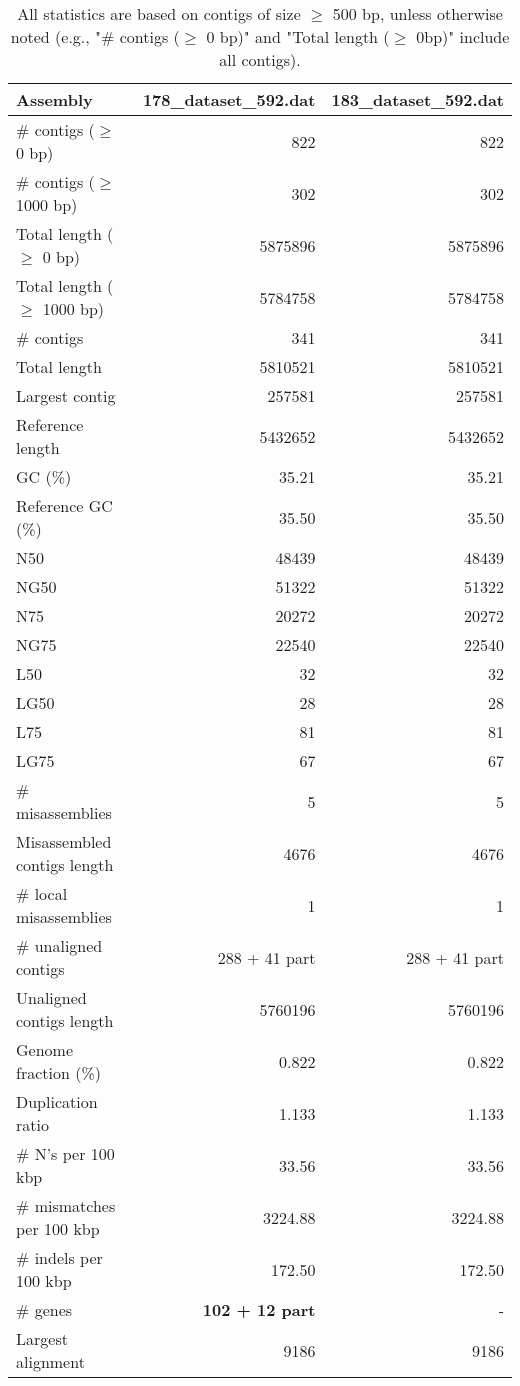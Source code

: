 \documentclass[12pt,a4paper]{article}
\begin{document}
\begin{table}[ht]
\begin{center}
\caption{All statistics are based on contigs of size $\geq$ 500 bp, unless otherwise noted (e.g., "\# contigs ($\geq$ 0 bp)" and "Total length ($\geq$ 0bp)" include all contigs).}
\begin{tabular}{|l*{2}{|r}|}
\hline
Assembly & 178\_dataset\_592.dat & 183\_dataset\_592.dat \\ \hline
\# contigs ($\geq$ 0 bp) & 822 & 822 \\ \hline
\# contigs ($\geq$ 1000 bp) & 302 & 302 \\ \hline
Total length ($\geq$ 0 bp) & 5875896 & 5875896 \\ \hline
Total length ($\geq$ 1000 bp) & 5784758 & 5784758 \\ \hline
\# contigs & 341 & 341 \\ \hline
Total length & 5810521 & 5810521 \\ \hline
Largest contig & 257581 & 257581 \\ \hline
Reference length & 5432652 & 5432652 \\ \hline
GC (\%) & 35.21 & 35.21 \\ \hline
Reference GC (\%) & 35.50 & 35.50 \\ \hline
N50 & 48439 & 48439 \\ \hline
NG50 & 51322 & 51322 \\ \hline
N75 & 20272 & 20272 \\ \hline
NG75 & 22540 & 22540 \\ \hline
L50 & 32 & 32 \\ \hline
LG50 & 28 & 28 \\ \hline
L75 & 81 & 81 \\ \hline
LG75 & 67 & 67 \\ \hline
\# misassemblies & 5 & 5 \\ \hline
Misassembled contigs length & 4676 & 4676 \\ \hline
\# local misassemblies & 1 & 1 \\ \hline
\# unaligned contigs & 288 + 41 part & 288 + 41 part \\ \hline
Unaligned contigs length & 5760196 & 5760196 \\ \hline
Genome fraction (\%) & 0.822 & 0.822 \\ \hline
Duplication ratio & 1.133 & 1.133 \\ \hline
\# N's per 100 kbp & 33.56 & 33.56 \\ \hline
\# mismatches per 100 kbp & 3224.88 & 3224.88 \\ \hline
\# indels per 100 kbp & 172.50 & 172.50 \\ \hline
\# genes & {\bf 102 + 12 part} & - \\ \hline
Largest alignment & 9186 & 9186 \\ \hline
\end{tabular}
\end{center}
\end{table}
\end{document}
